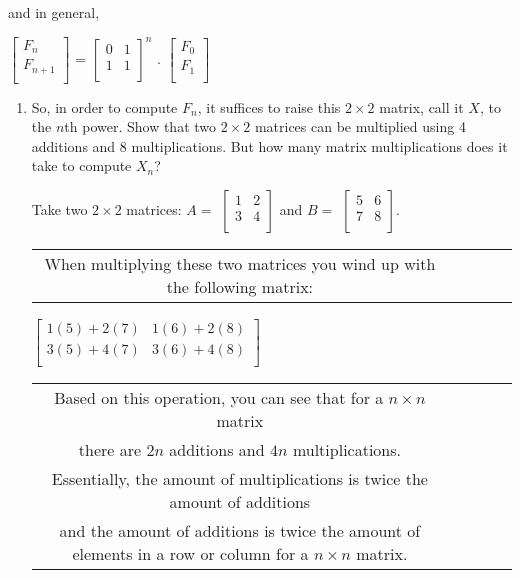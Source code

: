 \documentclass{article}
\begin{document}
   and in general,
   \begin{center}
   	$\begin{bmatrix}
				 F_{n}\\
				 F_{n+1}\\ 
	\end{bmatrix}$
    =
     $\begin{bmatrix}
           		 0&1\\
				 1&1\\
            \end{bmatrix}^n$
            .
       $\begin{bmatrix}
				 F_{0}\\
				 F_{1}\\ 
			\end{bmatrix}$     
   \end{center}
\begin{enumerate}[label=(\alph*)]
\item So, in order to compute $F_n$, it suffices to raise this $2\times2$ matrix, call it $X$, to the $n$th power.
Show that two $2\times2$ matrices can be multiplied using 4 additions and 8 multiplications. But how many matrix multiplications does it take to compute $X_n$?
\begin{center}
    Take two $2\times2$ matrices:
    $A=$
    $\begin{bmatrix}
    1&2\\
    3&4\\
    \end{bmatrix}$
    and $B=$
    $\begin{bmatrix}
    5&6\\
    7&8\\
    \end{bmatrix}$.
   \end{center}
   
   \begin{center}
   \begin{tabular} {c c c c c}
    When multiplying these two matrices you wind up with the following matrix:\\
    \end{tabular}
    $\begin{bmatrix}
    1(5)+2(7)&1(6)+2(8)\\
    3(5)+4(7)&3(6)+4(8)\\
    \end{bmatrix}$
    \begin{tabular}{c c c c c}
    Based on this operation, you can see that for a $n\times n$ matrix \\
    there are $2n$ additions and $4n$ multiplications.\\
    Essentially, the amount of multiplications is twice the amount of additions \\
    and the amount of additions is twice the amount of elements in a row or column for a $n\times n$ matrix.\\
    \end{tabular}
    \end{center}
  

\end{enumerate}
\end{document}
